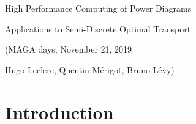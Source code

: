 \documentclass[aspectratio=169]{beamer}
\begin{document}
\begin{frame}
    \begin{center}
        {\huge High Performance Computing of Power Diagrams}

        \bigskip
        {\large Applications to Semi-Discrete Optimal Transport}
      
        \vfill
        (MAGA days, November 21, 2019
        
        \bigskip
        Hugo Leclerc, Quentin Mérigot, Bruno Lévy)
    \end{center}
\end{frame}

\section*{Introduction}
\end{document}
